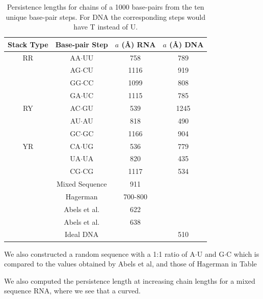 \begin{table}  
\begin{center}
\begin{tabular}{|c|c|c|c|}
\hline
Stack Type & Base-pair Step & $a$ (\AA) RNA & $a$ (\AA) DNA\\
\hline \hline
RR &  AA$\cdot$UU & 758      &  789   \\
   &  AG$\cdot$CU & 1116     &  919   \\
   &  GG$\cdot$CC & 1099     &  808   \\
   &  GA$\cdot$UC & 1115     &  785   \\
\hline
RY &  AC$\cdot$GU & 539      &  1245   \\
   &  AU$\cdot$AU & 818      &  490   \\
   &  GC$\cdot$GC & 1166     &  904   \\
\hline
YR &  CA$\cdot$UG & 536      &  779   \\
   &  UA$\cdot$UA & 820      &  435   \\
   &  CG$\cdot$CG & 1117     &  534   \\
\hline
   & Mixed Sequence  & 911   &       \\
   & Hagerman   & 700-800    &       \\
   & Abels et al.   & 622    &       \\ 
   & Abels et al.   & 638    &       \\
   & Ideal DNA    &          & 510   \\
\hline
\end{tabular}
\caption{Persistence lengths for chains of a 1000 base-pairs from the
  ten unique base-pair steps. For DNA the corresponding steps would
  have T instead of U.}
\label{tab:compare}
\end{center}
\end{table}

We also constructed a random sequence with a
1:1 ratio of A$\cdot$U and G$\cdot$C which is compared to the
values obtained by Abels et al, and those of Hagerman in Table


We also computed the persistence length at increasing chain lengths
for a mixed sequence RNA, where we see that a curved.






